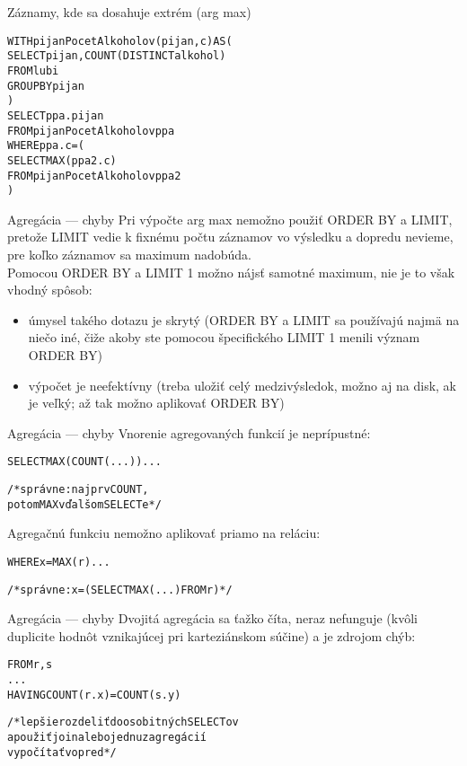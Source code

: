 \documentclass[12pt]{beamer}
\def\blue#1{\textcolor{Cerulean}{#1}}
\begin{document}
\begin{frame}[fragile]{Záznamy, kde sa dosahuje extrém (arg max)}
\begin{alltt}
\alert{WITH} \blue{pijanPocetAlkoholov}(pijan, c) AS (
    SELECT pijan, COUNT(DISTINCT alkohol)
    FROM lubi
    GROUP BY pijan
)
SELECT ppa.pijan
FROM \blue{pijanPocetAlkoholov} ppa
WHERE ppa.c = (
    SELECT MAX(ppa2.c)
    FROM \blue{pijanPocetAlkoholov} ppa2
)
\end{alltt}
\bigskip
\end{frame}

\begin{frame}[fragile]{Agregácia --- chyby}
Pri výpočte \alert{arg max} nemožno použiť ORDER BY a LIMIT, pretože LIMIT vedie k fixnému počtu záznamov vo výsledku
a dopredu nevieme, pre koľko záznamov sa maximum nadobúda.
\\[5mm]

Pomocou ORDER BY a LIMIT 1 možno nájsť samotné maximum,
nie je to však vhodný spôsob:
\begin{itemize}
\item úmysel takého dotazu je skrytý (ORDER BY a LIMIT sa používajú najmä na niečo iné, čiže akoby ste pomocou špecifického LIMIT 1 menili význam ORDER BY)
\item výpočet je neefektívny (treba uložiť celý medzivýsledok, možno aj na disk, ak je veľký; až tak možno aplikovať ORDER BY)
\end{itemize}
\end{frame}

\begin{frame}[fragile]{Agregácia --- chyby}
Vnorenie agregovaných funkcií je neprípustné:
\begin{alltt}
SELECT \alert{MAX(COUNT(...))} ...

/* správne: najprv COUNT,
   potom MAX v ďalšom SELECTe */
\end{alltt}
\vspace{10mm}
Agregačnú funkciu nemožno aplikovať priamo na reláciu:
\begin{alltt}
WHERE x = \alert{MAX(r)} ...

/* správne: x = (SELECT MAX(...) FROM r) */
\end{alltt}
\end{frame}

\begin{frame}[fragile]{Agregácia --- chyby}
Dvojitá agregácia sa ťažko číta, neraz nefunguje (kvôli duplicite hodnôt vznikajúcej pri karteziánskom súčine) a je zdrojom chýb:
\begin{alltt}
FROM r, s
...
HAVING COUNT(r.x) = COUNT(s.y)

/* lepšie rozdeliť do osobitných SELECTov
a použiť join alebo jednu z agregácií
vypočítať vopred */
\end{alltt}
\end{frame}
\end{document}
